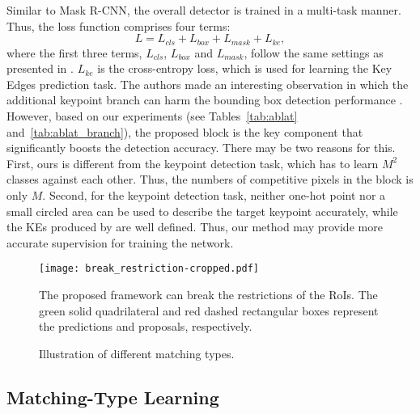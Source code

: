 Similar to Mask R-CNN, the overall detector is trained in a multi-task manner.  Thus, the loss function comprises four terms: 
\begin{equation}
	L = L_{cls} + L_{box} + L_{mask} + L_{ke},
\end{equation}
\noindent where the first three terms, $L_{cls}$, $L_{box}$ and $L_{mask}$, follow the same settings as presented in \cite{he2017mask}.
$L_{ke}$ is the cross-entropy loss, which is used for learning the Key Edges prediction task.
The authors made an interesting observation in which the additional keypoint branch can
harm the bounding box detection performance \cite{he2017mask}. However, based on our experiments (see Tables~\ref{tab:ablat} and~\ref{tab:ablat_branch}), the proposed \Ours block is the key component that significantly boosts 
the
detection accuracy. There may be two reasons for this. First, ours is different 
from the keypoint detection task, which has to learn $M^{2}$ classes against each other. Thus, the numbers of competitive pixels in the \Ours block is only $M$. Second, for the keypoint detection task, neither one-hot point nor a small circled area can be used to describe the target keypoint accurately, while the KEs produced by \Ours are 
well defined. 
Thus, our method may provide more accurate supervision for training the network.



\begin{figure}[t!]
	\centering
	\texttt{[image: break\_restriction-cropped.pdf]}
	\caption{The proposed framework can break the restrictions of the RoIs. The green solid quadrilateral and red dashed rectangular boxes represent the predictions and proposals, respectively.}
	\label{fig:break_restriction}
\end{figure}

\begin{figure}[b!]
	\centering
	\hspace{0.05cm}
	\caption{Illustration of different matching types.}
	\label{fig:match_types}
\end{figure}



\subsection{Matching-Type Learning}

